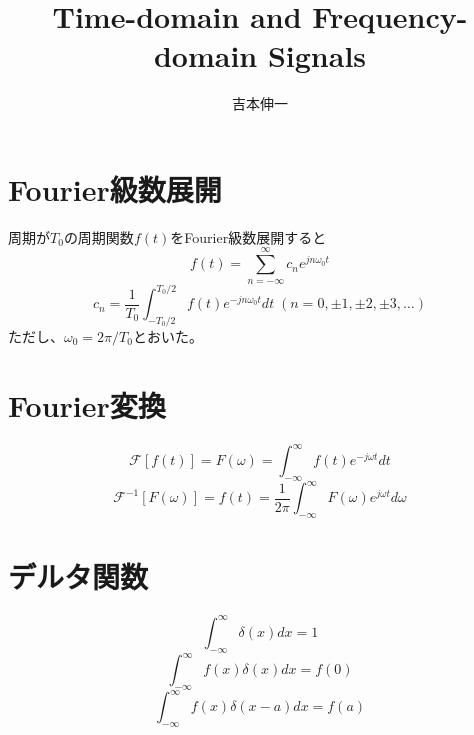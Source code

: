 \documentclass[]{jlreq}
\theoremstyle{definition}
\begin{document}
\title{Time-domain and Frequency-domain Signals}
\author{吉本伸一}
\maketitle
\tableofcontents
\clearpage

\section{Fourier級数展開}
周期が$T_0$の周期関数$f(t)$をFourier級数展開すると
%
\begin{equation}
  f(t) = \sum_{n=-\infty}^{\infty} c_n e^{j n \omega_0 t}
  \label{fourier_series}
\end{equation}
%
\begin{equation}
  c_n = \frac{1}{T_0} \int_{-T_0/2}^{T_0/2} f(t) e^{- j n \omega_0 t} dt　\; (n = 0, \pm 1, \pm 2, \pm 3, \dots)
  \label{fourier_coef}
\end{equation}
%
ただし、$\omega_0 = 2\pi/T_0$とおいた。
%
\section{Fourier変換}
\begin{equation}
  \mathcal{F}[f(t)] = F(\omega) = \int_{-\infty}^{\infty} f(t) e^{-j\omega t} dt
  \label{ft}
\end{equation}
%
\begin{equation}
  \mathcal{F}^{-1}[F(\omega)] = f(t) = \frac{1}{2\pi}\int_{-\infty}^{\infty} F(\omega) e^{j\omega t} d\omega
  \label{invft}
\end{equation}

\section{デルタ関数}
\begin{equation}
  \int_{-\infty}^{\infty} \delta (x) dx = 1
\end{equation}
%
\begin{equation}
  \int_{-\infty}^{\infty} f(x) \delta (x) dx = f(0)
\end{equation}
%
\begin{equation}
  \int_{-\infty}^{\infty} f(x) \delta (x - a) dx = f(a)
\end{equation}
%
\end{document}
